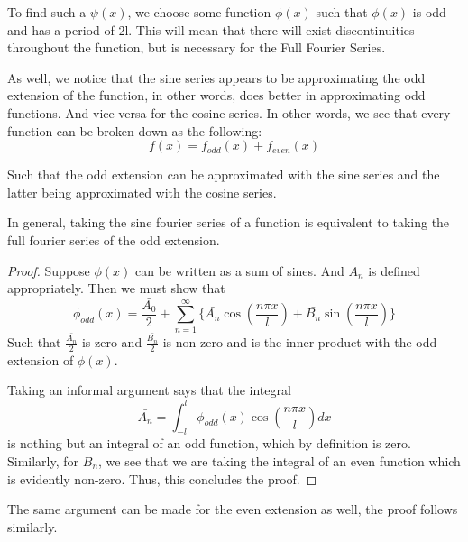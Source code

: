 \documentclass{article}
\begin{document}
To find such a $\psi(x)$, we choose some function $\phi(x)$ such that $\phi(x)$ is odd and has a period of 2l. This will mean that
there will exist discontinuities throughout the function, but is necessary for the Full Fourier Series. 


As well, we notice that the sine series appears to be approximating the odd extension of the function, in other words, does better in approximating odd functions. 
And vice versa for the cosine series. In other words, we see that every function can be broken down as the following:
\begin{equation}
    f(x) = f_{odd}(x) + f_{even}(x)
\end{equation}

Such that the odd extension can be approximated with the sine series and the latter being approximated with the cosine series. 

In general, taking the sine fourier series of a function is equivalent to taking the full fourier series of the odd extension. 

\begin{proof}
    Suppose $\phi(x)$ can be written as a sum of sines. And $A_n$ is defined appropriately. Then we must show that 
    \begin{equation}
        \phi_{odd}(x) = \frac{\bar{A_0}}{2} + \sum_{n=1}^{\infty}\{\bar{A_n}\cos(\frac{n\pi x}{l}) + \bar{B_n}\sin(\frac{n\pi x}{l})\}
    \end{equation}
    Such that $\frac{\bar{A_n}}{2}$ is zero and $\frac{\bar{B_n}}{2}$ is non zero and is the inner product with the odd extension of $\phi(x)$. 

    Taking an informal argument says that the integral
    \begin{equation}
        \bar{A_n} = \int_{-l}^{l}\phi_{odd}(x)\cos(\frac{n\pi x}{l})dx
    \end{equation}
    is nothing but an integral of an odd function, which by definition is zero. Similarly, for $B_n$, we see that we are taking the integral of an even function which is evidently non-zero.
    Thus, this concludes the proof. 
\end{proof}

The same argument can be made for the even extension as well, the proof follows similarly. 
\end{document}
